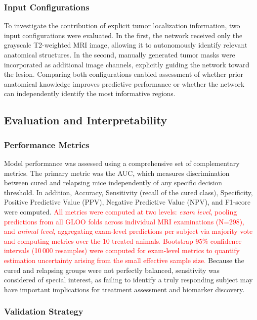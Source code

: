 \documentclass{article}
\begin{document}
\subsubsection{Input Configurations}

To investigate the contribution of explicit tumor localization information, two input configurations were evaluated. In the first, the network received only the grayscale T2-weighted MRI image, allowing it to autonomously identify relevant anatomical structures. In the second, manually generated tumor masks were incorporated as additional image channels, explicitly guiding the network toward the lesion. Comparing both configurations enabled assessment of whether prior anatomical knowledge improves predictive performance or whether the network can independently identify the most informative regions.

\subsection{Evaluation and Interpretability}

\subsubsection{Performance Metrics}

Model performance was assessed using a comprehensive set of complementary metrics. The primary metric was the AUC, which measures discrimination between cured and relapsing mice independently of any specific decision threshold. In addition, Accuracy, Sensitivity (recall of the cured class), Specificity, Positive Predictive Value (PPV), Negative Predictive Value (NPV), and F1-score were computed. \textcolor{red}{All metrics were computed at two levels: \textit{exam level}, pooling predictions from all GLOO folds across individual MRI examinations (N=298), and \textit{animal level}, aggregating exam-level predictions per subject via majority vote and computing metrics over the 10 treated animals. Bootstrap 95\% confidence intervals (10\,000 resamples) were computed for exam-level metrics to quantify estimation uncertainty arising from the small effective sample size.} Because the cured and relapsing groups were not perfectly balanced, sensitivity was considered of special interest, as failing to identify a truly responding subject may have important implications for treatment assessment and biomarker discovery.

\subsubsection{Validation Strategy}
\end{document}
